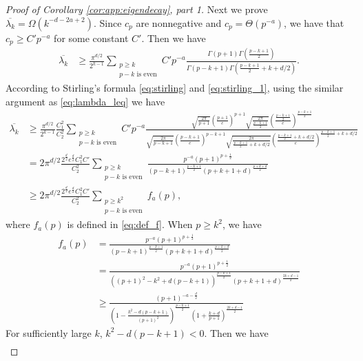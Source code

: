 \begin{proof}[Proof of Corollary \ref{cor:app:eigendecay}, part 1]
Next we prove $\overline{\lambda_k}=\Omega(k^{-d-2a+2})$. Since $c_p$ are nonnegative and $c_p=\Theta(p^{-a})$, we have that $c_p\geq C' p^{-a}$ for some constant $C'$. Then we have
\begin{align}
\overline{\lambda_k} 
&\geq \frac{\pi^{d/2}}{2^{k-1}}\sum_{\substack{p\geq k\\p-k\text{ is even}}} C' p^{-a} \frac{ \Gamma(p+1)\Gamma(\frac{p-k+1}{2})}{\Gamma(p-k+1)\Gamma(\frac{p-k+1}{2}+k+d/2)}.
\end{align} 
According to Stirling's formula \eqref{eq:stirling} and \eqref{eq:stirling_1}, using the similar argument as \eqref{eq:lambda_leq} we have
\begin{align}
\overline{\lambda_k} 
&\geq \frac{\pi^{d/2}}{2^{k-1}}\frac{C_1^2}{C_2^2}\sum_{\substack{p\geq k\\p-k\text{ is even}}} C' p^{-a} \frac{ \sqrt{\frac{2\pi}{p+1}}\left(\frac{p+1}{e}\right)^{p+1}\sqrt{\frac{2\pi}{\frac{p-k+1}{2}}}\left(\frac{\frac{p-k+1}{2}}{e}\right)^\frac{p-k+1}{2}}{\sqrt{\frac{2\pi}{{p-k+1}}}\left(\frac{p-k+1}{e}\right)^{p-k+1}\sqrt{\frac{2\pi}{\frac{p-k+1}{2}+k+d/2}}\left(\frac{\frac{p-k+1}{2}+k+d/2}{e}\right)^{\frac{p-k+1}{2}+k+d/2}}\\
\label{eq:lambda_geq}
&= 2\pi^{d/2}\frac{2^{\frac{d}{2}}e^{\frac{d}{2}}C_1^2C'}{C_2^2}\sum_{\substack{p\geq k\\p-k\text{ is even}}} \frac{ p^{-a}\left({p+1}\right)^{p+\frac{1}{2}}}{\left({p-k+1}\right)^{\frac{p-k+1}{2}}\left({p+k+1+d}\right)^{\frac{p+k+d}{2}}}\\
&\geq 2\pi^{d/2}\frac{2^{\frac{d}{2}}e^{\frac{d}{2}}C_1^2C'}{C_2^2}\sum_{\substack{p\geq k^2\\p-k\text{ is even}}} f_a(p),
\end{align}
where $f_a(p)$ is defined in \eqref{eq:def_f}. 
When $p \geq k^2$, we have
\begin{align*}
    f_a(p)&=\frac{ p^{-a}\left({p+1}\right)^{p+\frac{1}{2}}}{\left({p-k+1}\right)^{\frac{p-k+1}{2}}\left({p+k+1+d}\right)^{\frac{p+k+d}{2}}}\\
    &=\frac{ p^{-a}\left({p+1}\right)^{p+\frac{1}{2}}}{\left((p+1)^2-k^2+d(p-k+1)\right)^{\frac{p-k+1}{2}}\left({p+k+1+d}\right)^{\frac{2k+d-1}{2}}}\\
    &\geq\frac{ \left({p+1}\right)^{-a-\frac{d}{2}}}{\left(1-\frac{k^2-d(p-k+1)}{(p+1)^2}\right)^{\frac{p-k+1}{2}}\left({1+\frac{k+d}{p+1}}\right)^{\frac{2k+d-1}{2}}}
\end{align*}
For sufficiently large $k$, $k^2-d(p-k+1)<0$. Then we have
\begin{align*}

\end{align*}
\end{proof}
